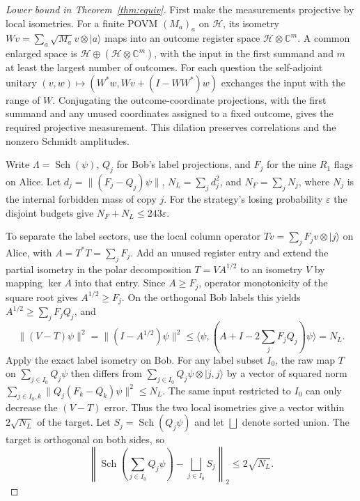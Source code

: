 \begin{proof}[Lower bound in Theorem~\ref{thm:equiv}]
First make the measurements projective by local isometries. For a
finite POVM $(M_a)_a$ on $\mathcal H$, its isometry
$Wv=\sum_a\sqrt{M_a}v\otimes|a\rangle$ maps into an outcome register
space $\mathcal H\otimes\mathbb C^m$. A common enlarged space is
$\mathcal H\oplus(\mathcal H\otimes\mathbb C^m)$, with the input in the
first summand and $m$ at least the largest number of outcomes. For
each question the self-adjoint unitary
$(v,w)\mapsto(W^*w,Wv+(I-WW^*)w)$ exchanges the input with the range
of $W$. Conjugating the outcome-coordinate projections, with the
first summand and any unused coordinates assigned to a fixed
outcome, gives the required projective measurement. This dilation
preserves correlations and the nonzero Schmidt amplitudes.

Write $\Lambda=\operatorname{Sch}(\psi)$, $Q_j$ for Bob's label
projections, and $F_j$ for the nine $R_1$ flags on Alice. Let
$d_j=\|(F_j-Q_j)\psi\|$, $N_L=\sum_j d_j^2$, and $N_F=\sum_j N_j$,
where $N_j$ is the internal forbidden mass of copy $j$. For the
strategy's losing probability $\varepsilon$ the disjoint budgets
give $N_F+N_L\le243\varepsilon$.

To separate the label sectors, use the local column operator
$Tv=\sum_j F_jv\otimes|j\rangle$ on Alice, with
$A=T^*T=\sum_jF_j$. Add an unused register entry and extend the partial
isometry in the polar decomposition $T=V A^{1/2}$ to an isometry
$V$ by mapping $\ker A$ into that entry. Since $A\ge F_j$, operator
monotonicity of the square root gives $A^{1/2}\ge F_j$. On the
orthogonal Bob labels this yields $A^{1/2}\ge\sum_j F_jQ_j$, and
\[
 \|(V-T)\psi\|^2=\|(I-A^{1/2})\psi\|^2
 \le \langle\psi,(A+I-2\textstyle\sum_j F_jQ_j)\psi\rangle=N_L.
\]
Apply the exact label isometry on Bob. For any label subset $I_0$,
the raw map $T$ on $\sum_{j\in I_0}Q_j\psi$ then differs from
$\sum_{j\in I_0}Q_j\psi\otimes|j,j\rangle$ by a vector of squared
norm $\sum_{j\in I_0,k}\|Q_j(F_k-Q_k)\psi\|^2\le N_L$.
The same input restricted to $I_0$ can only decrease the
$(V-T)$ error. Thus the two local isometries give a vector within
$2\sqrt{N_L}$ of the target.
Let $S_j=\operatorname{Sch}(Q_j\psi)$ and let $\bigsqcup$ denote
sorted union. The target is orthogonal on both sides, so
\[
 \left\|\operatorname{Sch}\left(\sum_{j\in I_0}Q_j\psi\right)
      -\bigsqcup_{j\in I_0}S_j\right\|_2\le2\sqrt{N_L}.
\]


\end{proof}
